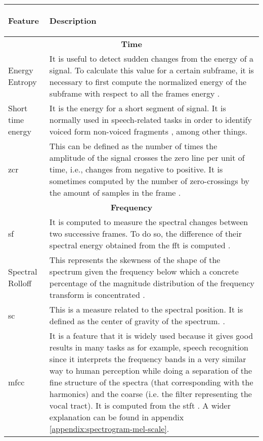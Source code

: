 	\begin{table}[h!]
		\begin{center}
			\centering
			\begin{tabular}{|| m{9em} | m{24em} ||}
				\hline
				\begin{center}\textbf{Feature}\end{center}& \begin{center}\textbf{Description}\end{center} \\
				\hline\hline
				\multicolumn{2}{||c||}{\textbf{Time}} \\
				\hline
				Energy Entropy & It is useful to detect sudden changes from the energy of a signal. To calculate this value for a certain subframe, it is necessary to first compute the normalized energy of the subframe with respect to all the frames energy \cite{Giannakopoulos2006}. \\
				\hline
				Short time energy & It is the energy for a short segment of signal. It is normally used in speech-related tasks in order to identify voiced form non-voiced fragments \cite{Garcia-Gomez2016}, among other things. \\
				\hline
				\acrfull{zcr} & This can be defined as the number of times the amplitude of the signal crosses the zero line per unit of time, i.e., changes from negative to positive. It is sometimes computed by the number of zero-crossings by the amount of samples in the frame \cite{Giannakopoulos2006}. \\
				\hline
				\multicolumn{2}{||c||}{\textbf{Frequency}} \\
				\hline
				\acrfull{sf} & It is computed to measure the spectral changes between two successive frames. To do so, the difference of their spectral energy obtained from the \acrshort{fft} is computed \cite{Garcia-Gomez2016}.  \\
				\hline
				Spectral Rolloff & This represents the skewness of the shape of the spectrum given the frequency below which a concrete percentage of the magnitude distribution of the frequency transform is concentrated \cite{Garcia-Gomez2016}. \\
				\hline
				\acrfull{sc} & This is a measure related to the spectral position. It is defined as the center of gravity of the spectrum. %
				\cite{Giannakopoulos2006}. \\
				\hline
				\acrshort{mfcc} & It is a feature that it is widely used because it gives good results in many tasks as for example, speech recognition since it interprets the frequency bands in a very similar way to human perception while doing a separation of the fine structure of the spectra (that corresponding with the harmonics) and the coarse (i.e. the filter representing the vocal tract). It is computed from the \acrshort{stft} \cite{Garcia-Gomez2016}. A wider explanation can be found in appendix \ref{appendix:spectrogram-mel-scale}. \\

\end{tabular}
\end{center}
\end{table}
